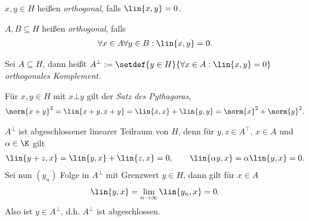 \begin{defn}
\label{defn:5.10}
\begin{defnenum}
  \item $x,y\in H$ heißen \emph{orthogonal}, falls
  $\lin{x,y}=0$.
  \item $A,B\subseteq H$ heißen \emph{orthogonal}, falls
  \begin{align*}
  \forall x\in A \forall y\in B : \lin{x,y}  = 0.
  \end{align*}
\item Sei $A\subseteq H$, dann heißt $A^\bot := \setdef{y\in H}{\forall x\in A
: \lin{x,y}=0}$ \emph{orthogonales
Komplement}.\fishhere
\end{defnenum} 
\end{defn}

\begin{bem}[Bemerkungen.]
\label{bem:5.11}
\begin{bemenum}
  \item Für $x,y\in H$ mit $x\bot y$ gilt der \emph{Satz des
  Pythagoras},
\begin{align*}
\norm{x+y}^2 = \lin{x+y,x+y} = \lin{x,x}+\lin{y,y} = \norm{x}^2 + \norm{y}^2.
\end{align*}
\item $A^\bot$ ist abgeschlossener linearer Teilraum von $H$, denn für $y,z\in
A^\top$, $x\in A$ und $\alpha\in \K$  gilt
\begin{align*}
\lin{y+z,x} =\lin{y,x}+\lin{z,x} = 0,\qquad
\lin{\alpha y,x} = \alpha\lin{y,x} =0.
\end{align*}
Sei nun $(y_n)$ Folge in $A^\bot$ mit Grenzwert $y\in H$, dann gilt für $x\in A$
\begin{align*}
\lin{y,x} = \lim\limits_{n\to\infty}\lin{y_n,x} = 0.
\end{align*}
Also ist $y\in A^\bot$, d.h. $A^\bot$ ist abgeschlossen.\maphere
\end{bemenum}
\end{bem}

